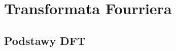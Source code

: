 \documentclass[12pt,titlepage]{report}
\begin{document}
\section{Transformata Fourriera}
\subsection{Podstawy DFT} 
\begin{figure}
	\centering
	\par
	\subfloat[]{
}
\end{figure}
\end{document}
